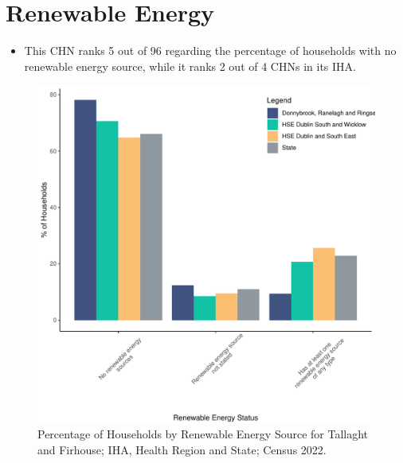 \documentclass{article}
\begin{document}
\section{Renewable Energy}\label{sect:RE}
\begin{itemize}
\item This CHN ranks  5 out of 96 regarding the percentage of households with no renewable energy source, while it ranks   2 out of 4 CHNs in its IHA.
\end{itemize}
\begin{figure}[H]
	\centering
	\includegraphics[width = 140mm]{../figures/RenewableEnergyED.pdf}
	\caption{Percentage of Households by Renewable Energy Source for Tallaght and Firhouse; IHA, Health Region and State; Census 2022.}
	\label{fig:vbnv}
	\end{figure}
\end{document}
